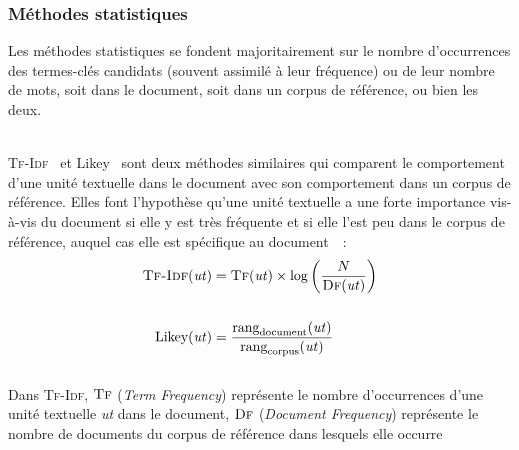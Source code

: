       \subsubsection{Méthodes statistiques}
      \label{subsubsec:main-state_of_the_art-automatic_keyphrase_extraction-unsupervised_keyphrase_extraction-statistical_approaches}
        Les méthodes statistiques se fondent majoritairement sur le nombre
        d'occurrences des ter\-mes-clés candidats (souvent assimilé à leur
        fréquence) ou de leur nombre de mots, soit dans le
        document, soit dans un corpus de référence, ou bien les deux.

        ~\\\textsc{Tf-Idf}~\cite{salton1975tfidf} et Likey~\cite{paukkeri2010likey}
        sont deux méthodes similaires qui comparent le comportement d'une unité
        textuelle dans le document avec son comportement dans un corpus de
        référence. Elles font l'hypothèse qu'une unité textuelle a une forte
        importance vis-à-vis du document si elle y est très fréquente et si elle
        l'est peu dans le corpus de référence, auquel cas elle est spécifique au
        document~\cite{jones1972tfidf}~:
        \begin{align}
          \text{\textsc{Tf-Idf}}(\text{\textit{ut}}) &= \textsc{Tf}(\text{\textit{ut}}) \times \log\left(\frac{N}{\textsc{Df}(\text{\textit{ut}})}\right) \label{math:tfidf}\\
          \notag\\
          \text{Likey}(\text{\textit{ut}}) &= \frac{\text{rang}_{\text{document}}(\text{\textit{ut}})}{\text{rang}_{\text{corpus}}(\text{\textit{ut}})} \label{math:likey}
        \end{align}\\
        Dans \textsc{Tf-Idf}, $\textsc{Tf}$ (\textit{Term Frequency}) représente
        le nombre d'occurrences d'une unité textuelle \textit{ut} dans le
        document, $\textsc{Df}$ (\textit{Document Frequency}) représente le
        nombre de documents du corpus de référence dans lesquels elle occurre
